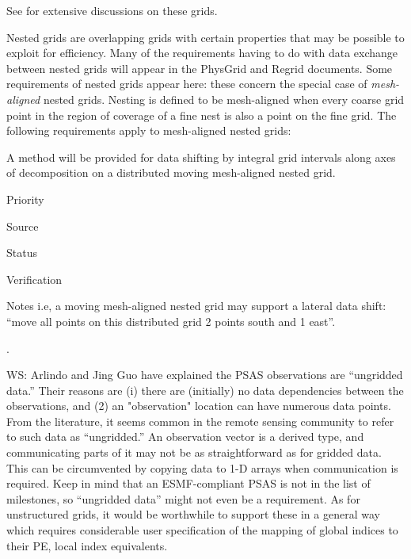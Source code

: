 


See \cite{art:heikes+:geodesic,art:majewski+:gme} for extensive
discussions on these grids.



Nested grids are overlapping grids with certain properties that may be
possible to exploit for efficiency. Many of the requirements having to
do with data exchange between nested grids will appear in the PhysGrid
and Regrid documents. Some requirements of nested grids appear here:
these concern the special case of \emph{mesh-aligned} nested
grids. Nesting is defined to be mesh-aligned when every coarse grid
point in the region of coverage of a fine nest is also a point on the
fine grid. The following requirements apply to mesh-aligned nested
grids:


A method will be provided for data shifting by integral grid intervals
along axes of decomposition on a distributed moving mesh-aligned
nested grid.

\begin{reqlist}
\item[Priority]
\item[Source]
\item[Status]
\item[Verification]
\item[Notes] i.e, a moving mesh-aligned nested grid may support a
  lateral data shift: ``move all points on this distributed grid 2
  points south and 1 east''.
\end{reqlist}

 \label{DG:Unstructured}.

WS: Arlindo and Jing Guo have explained the PSAS
observations are ``ungridded data.'' Their reasons are (i) there are
(initially) no data dependencies between the observations, and (2) an
"observation" location can have numerous data points.  From the
literature, it seems common in the remote sensing community to refer
to such data as ``ungridded.''  An observation vector is a derived
type, and communicating parts of it may not be as straightforward as for
gridded data.  This can be circumvented by copying data to 1-D arrays
when communication is required.  Keep in mind that an ESMF-compliant
PSAS is not in the list of milestones, so ``ungridded data'' might not
even be a requirement.  As for unstructured grids, it would be
worthwhile to support these in a general way which requires
considerable user specification of the mapping of global indices to
their PE, local index equivalents.


